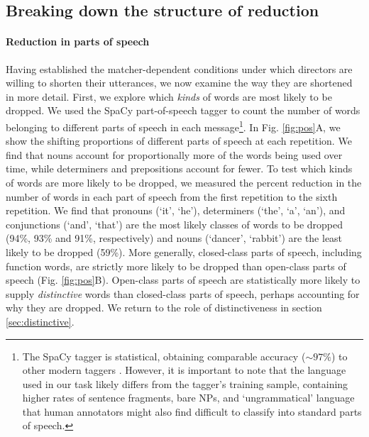 \documentclass[alpha-refs]{wiley-article}
\begin{document}
\subsection{Breaking down the structure of reduction}\label{reduction}

\paragraph{Reduction in parts of speech}

Having established the matcher-dependent conditions under which directors are willing to shorten their utterances, we now examine the way they are shortened in more detail.
First, we explore which \emph{kinds} of words are most likely to be dropped. 
We used the SpaCy part-of-speech tagger \citep{spacy2} to count the number of words belonging to different parts of speech in each message\footnote{The SpaCy tagger is statistical, obtaining comparable accuracy ($\sim 97\%$) to other modern taggers \cite{manning2011part}. However, it is important to note that the language used in our task likely differs from the tagger's training sample, containing higher rates of sentence fragments, bare NPs, and `ungrammatical' language that human annotators might also find difficult to classify into standard parts of speech.}. %
In Fig. \ref{fig:pos}A, we show the shifting proportions of different parts of speech at each repetition.
We find that nouns account for proportionally more of the words being used over time, while determiners and prepositions account for fewer.
To test which kinds of words are more likely to be dropped, we measured the percent reduction in the number of words in each part of speech from the first repetition to the sixth repetition. 
We find that pronouns (`it', `he'), determiners (`the', `a', `an'), and conjunctions (`and', `that') are the most likely classes of words to be dropped (94\%, 93\% and 91\%, respectively) and nouns (`dancer', `rabbit') are the least likely to be dropped (59\%).
More generally, closed-class parts of speech, including function words, are strictly more likely to be dropped than open-class parts of speech (Fig. \ref{fig:pos}B).
Open-class parts of speech are statistically more likely to supply \emph{distinctive} words than closed-class parts of speech, perhaps accounting for why they are dropped. 
We return to the role of distinctiveness in section \ref{sec:distinctive}.
\end{document}
